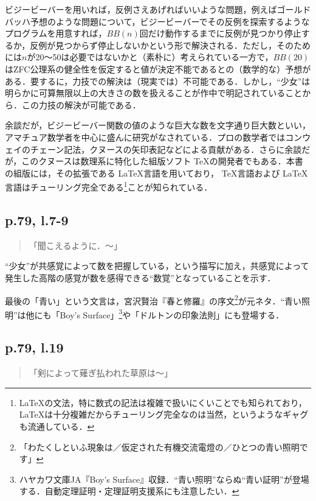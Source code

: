 \documentclass[10pt, a5paper, twoside]{jsarticle}
\theoremstyle{definition}
\begin{document}
			ビジービーバーを用いれば，反例さえあげればいいような問題，例えばゴールドバッハ予想のような問題について，ビジービーバーでその反例を探索するようなプログラムを用意すれば，$BB(n)$回だけ動作するまでに反例が見つかり停止するか，反例が見つからず停止しないかという形で解決される．ただし，そのためには$n$が20〜50は必要ではないかと（素朴に）考えられている一方で，$BB(20)$はZFC公理系の健全性を仮定すると値が決定不能であるとの（数学的な）予想\cite{bb20}がある．要するに，力技での解決は（現実では）不可能である．しかし，“少女”は明らかに可算無限以上の大きさの数を扱えることが作中で明記されていることから．この力技の解決が可能である．

			余談だが，ビジービーバー関数の値のような巨大な数を文字通り巨大数といい，アマチュア数学者を中心に盛んに研究がなされている．プロの数学者ではコンウェイのチェーン記法，クヌースの矢印表記などによる貢献がある．さらに余談だが，このクヌースは数理系に特化した組版ソフト \TeX の開発者でもある．本書の組版には，その拡張である \LaTeX 言語を用いており， \TeX 言語および \LaTeX 言語はチューリング完全である\footnote{\LaTeX の文法，特に数式の記法は複雑で扱いにくいことでも知られており，\LaTeX は十分複雑だからチューリング完全なのは当然，というようなギャグも流通している．}ことが知られている．

		\subsection{p.79, l.7-9}

			\begin{quote}

				「聞こえるように．〜」
				
			\end{quote}

			“少女”が共感覚によって数を把握している，という描写に加え，共感覚によって発生した高階の感覚が数を感得できる“数覚”となっていることを示す．

			最後の「青い」という文言は，宮沢賢治『春と修羅』の序文\footnote{「わたくしといふ現象は／仮定された有機交流電燈の／ひとつの青い照明です」\cite{myzw}}が元ネタ．“青い照明”は他にも「Boy's Surface」\footnote{ハヤカワ文庫JA『Boy's Surface』収録．“青い照明”ならぬ“青い証明”が登場する．自動定理証明・定理証明支援系にも注意したい．}や「ドルトンの印象法則」にも登場する．

		\subsection{p.79, l.19}

			\begin{quote}

				「剣によって薙ぎ払われた草原は〜」
				
			\end{quote}
\end{document}

